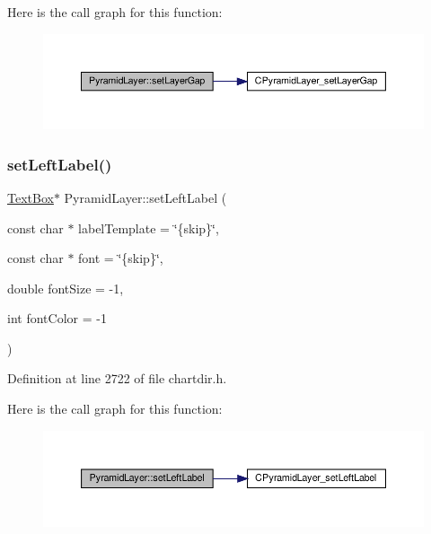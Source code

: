 Here is the call graph for this function\+:
\nopagebreak
\begin{figure}[H]
\begin{center}
\leavevmode
\includegraphics[width=350pt]{class_pyramid_layer_abece35f4e8b47f64c7d7fa1ed45d4281_cgraph}
\end{center}
\end{figure}
\mbox{\label{class_pyramid_layer_a47110e38cda797ccd23c9dd37bac8d80}} 
\subsubsection{\texorpdfstring{set\+Left\+Label()}{setLeftLabel()}}
{\footnotesize\ttfamily \hyperlink{class_text_box}{Text\+Box}$\ast$ Pyramid\+Layer\+::set\+Left\+Label (\begin{DoxyParamCaption}\item[{const char $\ast$}]{label\+Template = {\ttfamily \char`\"{}\{skip\}\char`\"{}},  }\item[{const char $\ast$}]{font = {\ttfamily \char`\"{}\{skip\}\char`\"{}},  }\item[{double}]{font\+Size = {\ttfamily -\/1},  }\item[{int}]{font\+Color = {\ttfamily -\/1} }\end{DoxyParamCaption})\hspace{0.3cm}{\ttfamily [inline]}}



Definition at line 2722 of file chartdir.\+h.

Here is the call graph for this function\+:
\nopagebreak
\begin{figure}[H]
\begin{center}
\leavevmode
\includegraphics[width=350pt]{class_pyramid_layer_a47110e38cda797ccd23c9dd37bac8d80_cgraph}
\end{center}
\end{figure}
\mbox{\label{class_pyramid_layer_ab9f1119330312a09c4a9b02681cdb955}} 
